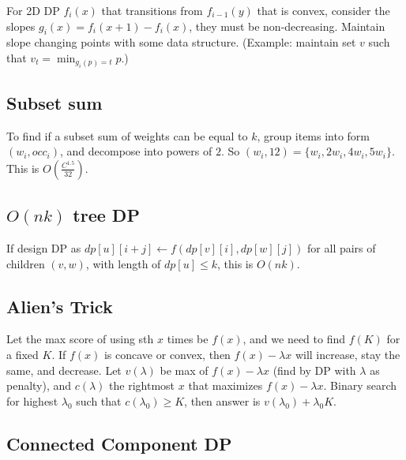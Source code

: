 		For 2D DP $f_i(x)$ that transitions from $f_{i-1}(y)$ that is convex, consider the slopes $g_i(x)=f_i(x+1)-f_i(x)$, they must be non-decreasing. Maintain slope changing points with some data structure. (Example: maintain set $v$ such that $v_{t}=\min_{g_i(p)=t} p$.)

	\subsection{Subset sum}

		To find if a subset sum of weights can be equal to $k$, group items into form $(w_i, occ_i)$, and decompose into powers of $2$. So $(w_i,12)=\{w_i,2w_i,4w_i,5w_i\}$. This is $O(\frac{C^{1.5}}{32})$.



	\subsection{$O(nk)$ tree DP}

		If design DP as $dp[u][i+j] \leftarrow f(dp[v][i], dp[w][j])$ for all pairs of children $(v, w)$, with length of $dp[u] \le k$, this is $O(nk)$.

	\subsection{Alien's Trick}
	
		Let the max score of using sth $x$ times be $f(x)$, and we need to find $f(K)$ for a fixed $K$. If $f(x)$ is concave or convex, then $f(x) - \lambda x$ will increase, stay the same, and decrease. Let $v(\lambda)$ be max of $f(x)-\lambda x$ (find by DP with $\lambda$ as penalty), and $c(\lambda)$ the rightmost $x$ that maximizes $f(x)-\lambda x$. Binary search for highest $\lambda_0$ such that $c(\lambda_0) \ge K$, then answer is $v(\lambda_0) + \lambda_0 K$.

	\subsection{Connected Component DP}


